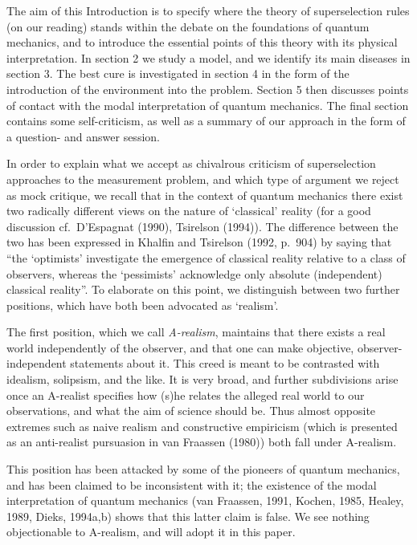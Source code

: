 \documentclass[12pt,titlepage]{article}
\begin{document}
The aim of this Introduction is to specify where the theory of superselection
rules (on our reading)
stands within the debate on the foundations of quantum mechanics, and to
introduce the essential
points of this theory with its physical interpretation. In section 2 we study a
model, and we
identify its main diseases in section 3. The best cure
is
investigated in section 4 in the form of the introduction of the environment
into the problem.
Section 5 then discusses points of contact with the modal interpretation of
quantum mechanics.
The final section contains some self-criticism, as well as a summary of our
approach in the form of
a question- and answer session.

In order to explain what we accept as chivalrous criticism of superselection
approaches to the
measurement problem, and which type of argument we reject as mock critique, we
recall that in the
context of quantum mechanics there exist two radically different views on the
nature of `classical'
reality (for a good discussion cf.\ D'Espagnat (1990), Tsirelson (1994)). The
difference between the
two has been expressed in Khalfin and Tsirelson (1992, p.\ 904) by saying that
``the
`optimists' investigate the emergence of classical reality relative to a class
of observers, whereas
the `pessimists' acknowledge only absolute (independent) classical reality''.
To elaborate on this
point, we  distinguish between two further positions, which have both been
advocated as `realism'.

 The first position, which we call {\em A-realism},
maintains that there exists a real world independently of the observer, and
that one can make
objective, observer-independent statements about it. This creed is meant to be
contrasted with
idealism, solipsism, and the like. It is very broad, and further subdivisions
arise once an
A-realist specifies how (s)he relates the alleged real world to our
observations, and what the aim
of science should be. Thus almost opposite extremes such as naive realism and
constructive empiricism
(which is presented as an anti-realist pursuasion  in van Fraassen (1980)) both
fall under
A-realism.

 This position has been attacked by some of the pioneers of quantum
mechanics, and has been claimed to be inconsistent with it;  the existence of
the modal interpretation
of quantum mechanics  (van Fraassen, 1991, Kochen, 1985, Healey, 1989, Dieks,
1994a,b) shows that this
 latter claim is false. We see nothing objectionable to A-realism, and  will
adopt it in this paper.
\end{document}
